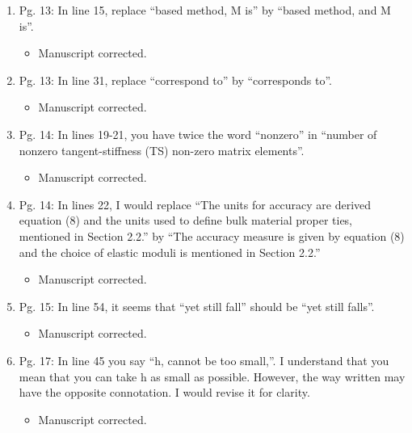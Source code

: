 \documentclass{article}
\begin{document}
\begin{enumerate}
 \item Pg. 13: In line 15, replace “based method, M is” by “based method, and M is”.

{\color{red}  
\begin{itemize}
     \item
 Manuscript corrected. 
  \end{itemize}}

 \item Pg. 13: In line 31, replace “correspond to” by “corresponds to”.

{\color{red}  
\begin{itemize}
     \item
 Manuscript corrected. 
  \end{itemize}}

 \item Pg. 14: In lines 19-21, you have twice the word “nonzero” in “number of nonzero
tangent-stiffness (TS) non-zero matrix elements”.

{\color{red}  
\begin{itemize}
     \item
 Manuscript corrected. 
  \end{itemize}}

 \item Pg. 14: In lines 22, I would replace “The units for accuracy are derived equation (8)
and the units used to deﬁne bulk material proper ties, mentioned in Section 2.2.” by
“The accuracy measure is given by equation (8) and the choice of elastic moduli is
mentioned in Section 2.2.”

{\color{red}  
\begin{itemize}
     \item
 Manuscript corrected. 
  \end{itemize}}

 \item Pg. 15: In line 54, it seems that “yet still fall” should be “yet still falls”.

{\color{red}  
\begin{itemize}
     \item
 Manuscript corrected. 
  \end{itemize}}

 \item Pg. 17: In line 45 you say “h, cannot be too small,”.
I understand that you mean that you can take h as small as possible. However, the way written may have the
opposite connotation. I would revise it for clarity.

{\color{red}  
\begin{itemize}
     \item
 Manuscript corrected. 
  \end{itemize}}


\end{enumerate}
\end{document}
